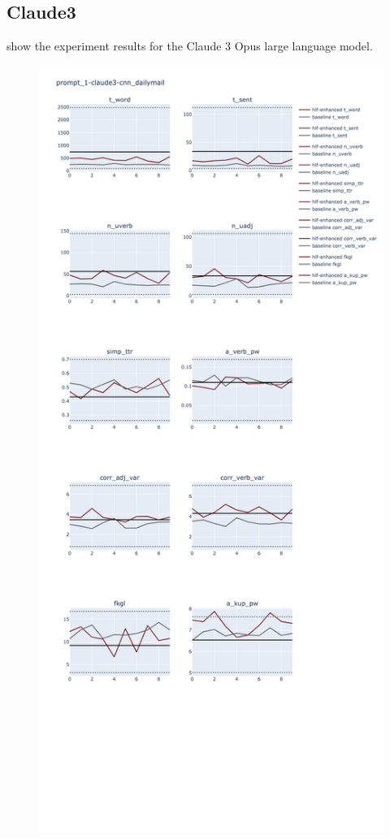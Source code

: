 \documentclass[11pt]{article}
\begin{document}
\subsection{Claude3}

show the experiment results for the Claude 3 Opus large language model.

\begin{figure}[ht]
    \includegraphics[width=\textwidth,height=0.9\textheight,scale=1]{plots/prompt_1/prompt_1-claude3-cnn_dailymail/prompt_1-claude3-cnn_dailymail.png}

\end{figure}
\end{document}
